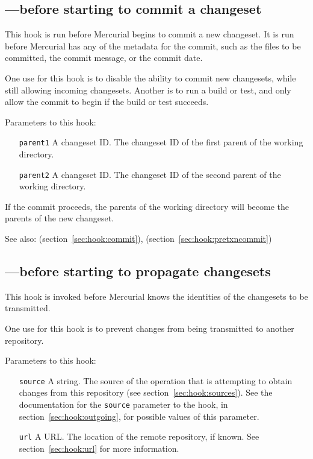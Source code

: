 \subsection{---before starting to commit a changeset}
\label{sec:hook:precommit}

This hook is run before Mercurial begins to commit a new changeset.
It is run before Mercurial has any of the metadata for the commit,
such as the files to be committed, the commit message, or the commit
date.

One use for this hook is to disable the ability to commit new
changesets, while still allowing incoming changesets.  Another is to
run a build or test, and only allow the commit to begin if the build
or test succeeds.

Parameters to this hook:
\begin{itemize}
\item[\texttt{parent1}] A changeset ID.  The changeset ID of the first
  parent of the working directory.
\item[\texttt{parent2}] A changeset ID.  The changeset ID of the second
  parent of the working directory.
\end{itemize}
If the commit proceeds, the parents of the working directory will
become the parents of the new changeset.

See also:  (section~\ref{sec:hook:commit}),
 (section~\ref{sec:hook:pretxncommit})

\subsection{---before starting to propagate changesets}
\label{sec:hook:preoutgoing}

This hook is invoked before Mercurial knows the identities of the
changesets to be transmitted.

One use for this hook is to prevent changes from being transmitted to
another repository.

Parameters to this hook:
\begin{itemize}
\item[\texttt{source}] A string.  The source of the operation that is
  attempting to obtain changes from this repository (see
  section~\ref{sec:hook:sources}).  See the documentation for the
  \texttt{source} parameter to the  hook, in
  section~\ref{sec:hook:outgoing}, for possible values of this
  parameter.
\item[\texttt{url}] A URL.  The location of the remote repository, if
  known.  See section~\ref{sec:hook:url} for more information.
\end{itemize}

